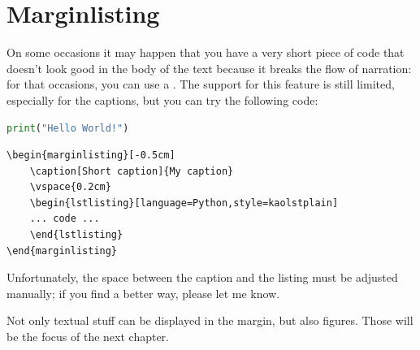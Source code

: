 \section{Marginlisting}

On some occasions it may happen that you have a very short piece of code 
that doesn't look good in the body of the text because it breaks the 
flow of narration: for that occasions, you can use a 
. The support for this feature is still 
limited, especially for the captions, but you can try the following 
code:

\begin{marginlisting}[-1.35cm]
	\caption[Margin listing example]{An example of a margin listing.}
	\vspace{0.6cm}
	\begin{lstlisting}[language=Python,style=kaolstplain]
print("Hello World!")
	\end{lstlisting}
\end{marginlisting}

\begin{verbatim}
\begin{marginlisting}[-0.5cm]
	\caption[Short caption]{My caption}
	\vspace{0.2cm}
	\begin{lstlisting}[language=Python,style=kaolstplain]
	... code ...
	\end{lstlisting}
\end{marginlisting}
\end{verbatim}

Unfortunately, the space between the caption and the listing must be 
adjusted manually; if you find a better way, please let me know.

Not only textual stuff can be displayed in the margin, but also figures. 
Those will be the focus of the next chapter.
